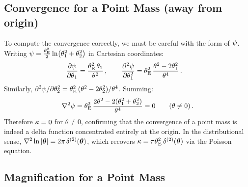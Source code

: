 \subsection{Convergence for a Point Mass (away from origin)}

To compute the convergence correctly, we must be careful with the
form of $\psi$.  Writing
$\psi = \frac{\theta_{\mathrm{E}}^2}{2}\ln(\theta_1^2 + \theta_2^2)$ in
Cartesian coordinates:
\begin{align}
    \frac{\partial\psi}{\partial\theta_1}
    &= \frac{\theta_{\mathrm{E}}^2\,\theta_1}{\theta^2} \,, \qquad
    \frac{\partial^2\psi}{\partial\theta_1^2}
    = \theta_{\mathrm{E}}^2\,\frac{\theta^2 - 2\theta_1^2}{\theta^4} \,.
\end{align}
Similarly, $\partial^2\psi/\partial\theta_2^2
= \theta_{\mathrm{E}}^2\,(\theta^2 - 2\theta_2^2)/\theta^4$.
Summing:
\begin{equation}
    \nabla^2\psi = \theta_{\mathrm{E}}^2\,
    \frac{2\theta^2 - 2(\theta_1^2 + \theta_2^2)}{\theta^4}
    = 0 \qquad (\theta \neq 0) \,.
    \label{eq:laplacian_psi_point}
\end{equation}
Therefore $\kappa = 0$ for $\theta \neq 0$, confirming that the
convergence of a point mass is indeed a delta function concentrated
entirely at the origin.  In the distributional sense,
$\nabla^2\ln|\boldsymbol{\theta}| = 2\pi\,\delta^{(2)}(\boldsymbol{\theta})$, which
recovers $\kappa = \pi\theta_{\mathrm{E}}^2\,\delta^{(2)}(\boldsymbol{\theta})$ via
the Poisson equation.

\subsection{Magnification for a Point Mass}

